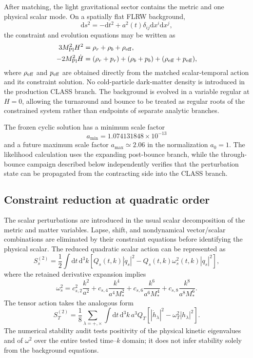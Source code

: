 \documentclass[12pt]{iopart}
\newcommand{\mpl}{M_{\rm Pl}}
\newcommand{\dd}{\mathrm{d}}
\begin{document}
After matching, the light gravitational sector contains the metric and one physical scalar mode.  On a spatially flat FLRW background,
\begin{equation}
\dd s^2=-\dd t^2+a^2(t)\delta_{ij}\dd x^i\dd x^j,
\end{equation}
the constraint and evolution equations may be written as
\begin{align}
3\mpl^2H^2 &= \rho_r+\rho_b+\rho_{\rm eff},\label{eq:friedmann}\\
-2\mpl^2\dot H &= (\rho_r+p_r)+(\rho_b+p_b)+(\rho_{\rm eff}+p_{\rm eff}),\label{eq:raych}\end{align}
where $\rho_{\rm eff}$ and $p_{\rm eff}$ are obtained directly from the matched scalar-temporal action and its constraint solution.  No cold-particle dark-matter density is introduced in the production CLASS branch.  The background is evolved in a variable regular at $H=0$, allowing the turnaround and bounce to be treated as regular roots of the constrained system rather than endpoints of separate analytic branches.

The frozen cyclic solution has a minimum scale factor
\begin{equation}
a_{\min}=1.074131848\times10^{-13}
\end{equation}
and a future maximum scale factor $a_{\max}\simeq2.06$ in the normalization $a_0=1$.  The likelihood calculation uses the expanding post-bounce branch, while the through-bounce campaign described below independently verifies that the perturbation state can be propagated from the contracting side into the CLASS branch.

\subsection{Constraint reduction at quadratic order}

The scalar perturbations are introduced in the usual scalar decomposition of the metric and matter variables.  Lapse, shift, and nondynamical vector/scalar combinations are eliminated by their constraint equations before identifying the physical scalar.  The reduced quadratic scalar action can be represented as
\begin{equation}
S_s^{(2)}=\frac12\int\dd t\,\dd^3k\left[
Q_s(t,k)|\dot q_s|^2-Q_s(t,k)\omega_s^2(t,k)|q_s|^2
\right],
\label{eq:scalarquad}
\end{equation}
where the retained derivative expansion implies
\begin{equation}
\omega_s^2=c_{s,2}^2\frac{k^2}{a^2}
+c_{s,4}\frac{k^4}{a^4M_*^2}
+c_{s,6}\frac{k^6}{a^6M_*^4}
+c_{s,8}\frac{k^8}{a^8M_*^6}.
\label{eq:omegas}
\end{equation}
The tensor action takes the analogous form
\begin{equation}
S_T^{(2)}=\frac18\sum_{\lambda=+,\times}\int\dd t\,\dd^3k\,
a^3Q_T\left[|\dot h_\lambda|^2-\omega_T^2|h_\lambda|^2\right].
\label{eq:tensorquad}
\end{equation}
The numerical stability audit tests positivity of the physical kinetic eigenvalues and of $\omega^2$ over the entire tested time--$k$ domain; it does not infer stability solely from the background equations.
\end{document}
